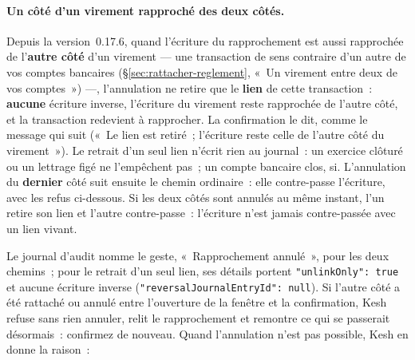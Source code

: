 \documentclass[a4paper,11pt,oneside]{article}
\begin{document}
\paragraph{Un côté d'un virement rapproché des deux côtés.} Depuis la version~0.17.6, quand
l'écriture du rapprochement est aussi rapprochée de l'\textbf{autre côté} d'un virement --- une
transaction de sens contraire d'un autre de vos comptes bancaires (\S\ref{sec:rattacher-reglement},
«~Un virement entre deux de vos comptes~») ---, l'annulation ne retire que le \textbf{lien} de
cette transaction~: \textbf{aucune} écriture inverse, l'écriture du virement reste rapprochée de
l'autre côté, et la transaction redevient à rapprocher. La confirmation le dit, comme le message
qui suit («~Le lien est retiré~; l'écriture reste celle de l'autre côté du virement~»). Le retrait
d'un seul lien n'écrit rien au journal~: un exercice clôturé ou un lettrage figé ne l'empêchent
pas~; un compte bancaire clos, si. L'annulation du \textbf{dernier} côté suit ensuite le chemin
ordinaire~: elle contre-passe l'écriture, avec les refus ci-dessous. Si les deux côtés sont annulés
au même instant, l'un retire son lien et l'autre contre-passe~: l'écriture n'est jamais
contre-passée avec un lien vivant.

Le journal d'audit nomme le geste, «~Rapprochement annulé~», pour les deux chemins~; pour le
retrait d'un seul lien, ses détails portent \texttt{"unlinkOnly": true} et aucune écriture inverse
(\texttt{"reversalJournalEntryId": null}). Si l'autre côté a été rattaché ou annulé entre
l'ouverture de la fenêtre et la confirmation, Kesh refuse sans rien annuler, relit le rapprochement
et remontre ce qui se passerait désormais~: confirmez de nouveau. Quand l'annulation n'est pas
possible, Kesh en donne la raison~:
\end{document}
